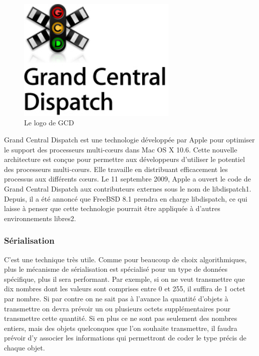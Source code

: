
\begin{figure}[htbp]
	\centering
		\includegraphics[width=3in]{Image/icone-gcd.jpg}
	\caption{Le logo de GCD}
	\label{fig:Image_icone_gcd}
\end{figure}


Grand Central Dispatch est une technologie développée par Apple pour optimiser le support des processeurs multi-cœurs dans Mac OS X 10.6.
Cette nouvelle architecture est conçue pour permettre aux développeurs d'utiliser le potentiel des processeurs multi-cœurs. Elle travaille en distribuant efficacement les processus aux différents cœurs.
Le 11 septembre 2009, Apple a ouvert le code de Grand Central Dispatch aux contributeurs externes sous le nom de libdispatch1. Depuis, il a été annoncé que FreeBSD 8.1 prendra en charge libdispatch, ce qui laisse à penser que cette technologie pourrait être appliquée à d'autres environnements libres2.



\subsubsection{Sérialisation} %
\label{ssub:sérialisation}

C'est une technique très utile. Comme pour beaucoup de choix algorithmiques, plus le mécanisme de sérialisation est spécialisé pour un type de données spécifique, plus il sera performant. Par exemple, si on ne veut transmettre que dix nombres dont les valeurs sont comprises entre 0 et 255, il suffira de 1 octet par nombre. Si par contre on ne sait pas à l'avance la quantité d'objets à transmettre on devra prévoir un ou plusieurs octets supplémentaires pour transmettre cette quantité. Si en plus ce ne sont pas seulement des nombres entiers, mais des objets quelconques que l'on souhaite transmettre, il faudra prévoir d'y associer les informations qui permettront de coder le type précis de chaque objet.

